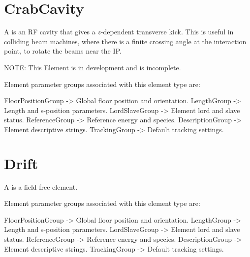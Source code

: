 \section{CrabCavity}
\label{s:crabcavity}

A  is an RF cavity that gives a $z$-dependent transverse kick. 
This is useful in colliding beam machines, where there is a finite crossing angle at the 
interaction point, to rotate the beams near the IP.

NOTE: This Element is in development and is incomplete.

Element parameter groups associated with this element type are:
\TOPrule
\begin{example}
  FloorPositionGroup -> Global floor position and orientation.  
  LengthGroup        -> Length and s-position parameters.  
  LordSlaveGroup     -> Element lord and slave status.  
  ReferenceGroup     -> Reference energy and species.  
  DescriptionGroup   -> Element descriptive strings.  
  TrackingGroup      -> Default tracking settings.  
\end{example}
\BOTTOMrule


\section{Drift}
\label{s:drift}

A  is a field free element.

Element parameter groups associated with this element type are:
\TOPrule
\begin{example}
  FloorPositionGroup -> Global floor position and orientation.  
  LengthGroup        -> Length and s-position parameters.  
  LordSlaveGroup     -> Element lord and slave status.  
  ReferenceGroup     -> Reference energy and species.  
  DescriptionGroup   -> Element descriptive strings.  
  TrackingGroup      -> Default tracking settings.  
\end{example}
\BOTTOMrule


